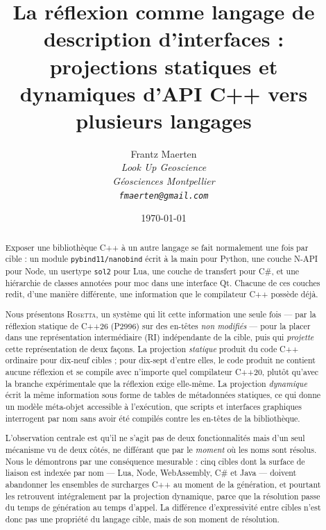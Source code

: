 \documentclass[11pt,a4paper]{article}
\title{\textbf{La réflexion comme langage de description d'interfaces :\\
projections statiques et dynamiques d'API C++ vers plusieurs langages}}
\author{
  Frantz Maerten\\
  \small\itshape{Look Up Geoscience}\\
  \small\itshape{Géosciences Montpellier}\\
  \small\texttt{fmaerten@gmail.com}
}
\date{\today}
\newcommand{\rosetta}{\textsc{Rosetta}}
\newcommand{\code}[1]{\texttt{\small #1}}
\begin{document}
\maketitle

\begin{abstract}
Exposer une bibliothèque C++ à un autre langage se fait normalement une fois par
cible : un module \code{pybind11/nanobind} écrit à la main pour Python, une couche N-API
pour Node, un usertype \code{sol2} pour Lua, une couche de transfert pour C\#,
et une hiérarchie de classes annotées pour moc dans une interface Qt. Chacune de
ces couches redit, d'une manière différente, une information que le compilateur C++ possède déjà.

Nous présentons \rosetta, un système qui lit cette information une seule fois
--- par la réflexion statique de C++26 (P2996) sur des en-têtes
\emph{non modifiés} --- pour la placer dans une représentation intermédiaire
(RI) indépendante de la cible, puis qui \emph{projette} cette représentation de
deux façons. La projection \emph{statique} produit du code C++ ordinaire pour
dix-neuf cibles ; pour dix-sept d'entre elles, le code produit ne contient
aucune réflexion et se compile avec n'importe quel compilateur C++20,
plutôt qu'avec la branche expérimentale que la réflexion exige elle-même. La
projection \emph{dynamique} écrit la même information sous forme de tables de
métadonnées statiques, ce qui donne un modèle méta-objet accessible à
l'exécution, que scripts et interfaces graphiques interrogent par nom sans avoir
été compilés contre les en-têtes de la bibliothèque.

L'observation centrale est qu'il ne s'agit pas de deux fonctionnalités mais d'un
seul mécanisme vu de deux côtés, ne différant que par le \emph{moment} où les
noms sont résolus. Nous le démontrons par une conséquence mesurable : cinq
cibles dont la surface de liaison est indexée par nom --- Lua, Node,
WebAssembly, C\# et Java --- doivent abandonner les ensembles de surcharges C++
au moment de la génération, et pourtant les retrouvent intégralement par la
projection dynamique, parce que la résolution passe du temps de génération au
temps d'appel. La différence d'expressivité entre cibles n'est donc pas une
propriété du langage cible, mais de son moment de résolution.


\end{abstract}
\end{document}

